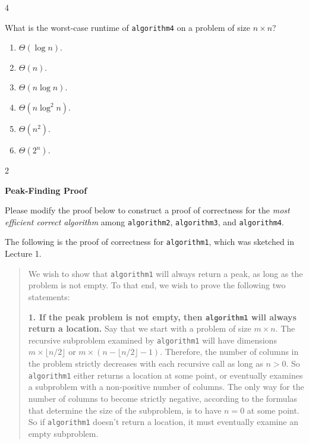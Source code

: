 \documentclass[12pt,twoside]{article}
\begin{document}
\begin{problems}
\begin{problemparts}
        \ifsolution \solution{}
            4
        \fi

        \problempart {} What is the worst-case runtime of \texttt{algorithm4} on a problem of size $n \times n$?
        \begin{enumerate}
            \item $\Theta(\log n)$.
            \item $\Theta(n)$.
            \item $\Theta(n \log n)$.
            \item $\Theta(n \log^2 n)$.
            \item $\Theta(n^2)$.
            \item $\Theta(2^n)$.
        \end{enumerate}

        \ifsolution \solution{}
            2
        \fi

    \end{problemparts}

    \problem {} \textbf{Peak-Finding Proof}

    Please modify the proof below to construct a proof of correctness for the
    \emph{most efficient correct algorithm} among \texttt{algorithm2},
    \texttt{algorithm3}, and \texttt{algorithm4}.

    The following is the proof of correctness for \texttt{algorithm1}, which was
    sketched in Lecture 1.

    \begin{quote}
        We wish to show that \texttt{algorithm1}
        will always return a peak,
        as long as the problem is not empty.
        To that end,
        we wish to prove the following two statements:

        {\bf 1. If the peak problem is not empty,
        then \texttt{algorithm1} will always return a location.}
        Say that we start with a problem of size $m \times n$.
        The recursive subproblem examined by \texttt{algorithm1}
        will have dimensions
        $m \times \lfloor n / 2 \rfloor$ or 
        $m \times \left(n - \lfloor n / 2 \rfloor - 1 \right)$.
        Therefore, the number of columns in the problem
        strictly decreases with each recursive call
        as long as $n > 0$.
        So \texttt{algorithm1} either returns a location at some point,
        or eventually examines a subproblem with a non-positive
        number of columns.
        The only way for the number of columns to become strictly negative,
        according to the formulas that determine the size of the subproblem,
        is to have $n = 0$ at some point.
        So if \texttt{algorithm1} doesn't return a location,
        it must eventually examine an empty subproblem.


\end{quote}
\end{problems}
\end{document}

